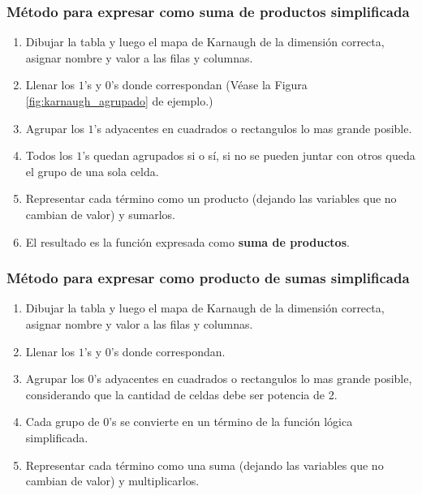 \documentclass{article}
\begin{document}
\subsubsection*{Método para expresar como suma de productos simplificada}
\begin{mdframed}[backgroundcolor=yellow!40,shadow=true,shadowsize=2pt,roundcorner=2pt]
    \begin{enumerate}
        \item Dibujar la tabla y luego el mapa de Karnaugh de la dimensión correcta, asignar nombre y valor a las filas y columnas.
        \item Llenar los $1$'s y $0$'s donde correspondan (Véase la Figura \ref{fig:karnaugh_agrupado} de ejemplo.)
        \item Agrupar los $1$'s adyacentes en cuadrados o rectangulos lo mas grande posible.
        \item Todos los $1$'s quedan agrupados si o sí, si no se pueden juntar con otros queda el grupo de una sola celda.
        \item Representar cada término como un producto (dejando las variables que no cambian de valor) y sumarlos.
        \item El resultado es la función expresada como \textbf{suma de productos}.
    \end{enumerate}
\end{mdframed}

\subsubsection*{Método para expresar como producto de sumas simplificada}
\begin{mdframed}[backgroundcolor=yellow!40,shadow=true,shadowsize=2pt,roundcorner=2pt]
    \begin{enumerate}
        \item Dibujar la tabla y luego el mapa de Karnaugh de la dimensión correcta, asignar nombre y valor a las filas y columnas.
        \item Llenar los $1$'s y $0$'s donde correspondan.
        \item Agrupar los $0$'s adyacentes en cuadrados o rectangulos lo mas grande posible, considerando que la cantidad de celdas debe ser potencia de 2.
        \item Cada grupo de $0$'s se convierte en un término de la función lógica simplificada.
        \item Representar cada término como una suma (dejando las variables que no cambian de valor) y multiplicarlos.
    \end{enumerate}
\end{mdframed}
\end{document}

